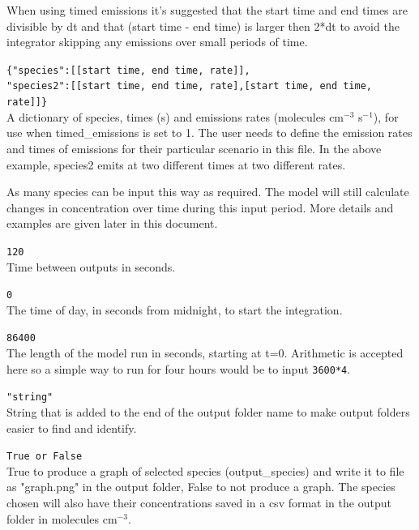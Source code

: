 \documentclass[a4paper]{refart}
\begin{document}
When using timed emissions it's suggested that the start time and end times are divisible by dt
and that (start time - end time) is larger then 2*dt to avoid the integrator skipping any
emissions over small periods of time.

\texttt{\{"species":[[start time, end time, rate]],\\
          "species2":[[start time, end time, rate],[start time, end time, rate]]\}}\\
A dictionary of species, times (s) and emissions rates  (molecules cm$^{-3}$ s$^{-1}$), for use when timed\_emissions is set to 1. The user needs to define the emission rates and times of emissions for their particular scenario in this file. In the above example, species2 emits at two different times at two different rates.

 As many species can be input this way as required. The model will still calculate changes in concentration over time during this input period. More details and examples are given later in this document.

\texttt{120}\\
Time between outputs in seconds. 

\texttt{0}\\
The time of day, in seconds from midnight, to start the integration.

\texttt{86400}\\
The length of the model run in seconds, starting at t=0. Arithmetic is accepted here so a simple way to run for four hours would be to input \texttt{3600*4}.

\texttt{"string"}\\
String that is added to the end of the output folder name to make output folders easier to find and identify.

\texttt{True or False}\\
True to produce a graph of selected species (output\_species) and write it to file as "graph.png" in the output folder, False to not produce a graph. The species chosen will also have their concentrations saved in a csv format in the output folder in molecules cm$^{-3}$.
\end{document}
